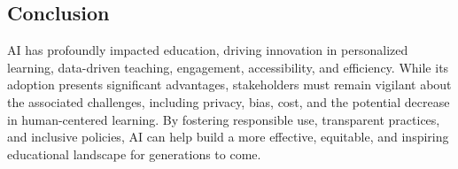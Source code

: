 \documentclass[12pt, letterpaper]{article}
\begin{document}
\subsection{Conclusion}
AI has profoundly impacted education, driving innovation in personalized learning, data-driven teaching, engagement, accessibility, and efficiency. While its adoption presents significant advantages, stakeholders must remain vigilant about the associated challenges, including privacy, bias, cost, and the potential decrease in human-centered learning. By fostering responsible use, transparent practices, and inclusive policies, AI can help build a more effective, equitable, and inspiring educational landscape for generations to come.
\end{document}
